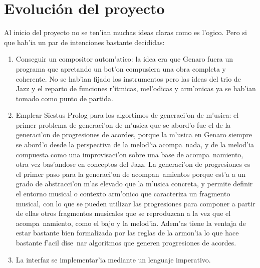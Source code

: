 \section{Evoluci\'on del proyecto}
Al inicio del proyecto no se ten'ian muchas ideas claras como es l'ogico. Pero si que hab'ia un par de intenciones bastante decididas:
        \begin{enumerate}
        \item Conseguir un compositor autom'atico: la idea era que Genaro fuera un programa que apretando un bot'on compusiera una obra completa y coherente. No se hab'ian fijado los instrumentos pero las ideas del trio de Jazz y el reparto de funciones r'itmicas, mel'odicas y arm'onicas ya se hab'ian tomado como punto de partida. 
        \item Emplear Sicstus Prolog para los algortimos de generaci'on de m'usica: el primer problema de generaci'on de m'usica que se abord'o fue el de la generaci'on de progresiones de acordes, porque la m'usica en Genaro siempre se abord'o desde la perspectiva de la melod'ia acompa~nada, y de la melod'ia compuesta como una improvisaci'on sobre una base de acompa~namiento, otra vez bas'andose en conceptos del Jazz. 
\newline
La generaci'on de progresiones es el primer paso para la generaci'on de acompan~amientos porque est'a a un grado de abstracci'on m'as elevado que la m'usica concreta, y permite definir el entorno musical o contexto arm'onico que caracteriza un fragmento musical, con lo que se pueden utilizar las progresiones para componer a partir de ellas otros fragmentos musicales que se reproduzcan a la vez que el acompa~namiento, como el bajo y la melod'ia. Adem'as tiene la ventaja de estar bastante bien formalizada por las reglas de la armon'ia lo que hace bastante f'acil dise~nar algoritmos que generen progresiones de acordes.
        \item La interfaz se implementar'ia mediante un lenguaje imperativo.
        \end{enumerate}

